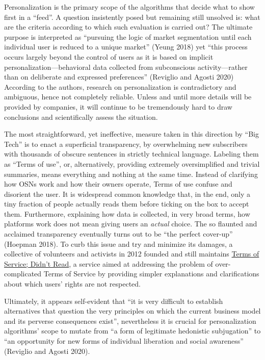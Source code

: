 \documentclass[
  a4paper,
]{book}
\begin{document}
Personalization is the primary scope of the algorithms that decide what to show first in a ``feed''. A question insistently posed but remaining still unsolved is: what are the criteria according to which such evaluation is carried out? The ultimate purpose is interpreted as ``pursuing the logic of market segmentation until each individual user is reduced to a unique market'' {(Yeung 2018)} yet ``this process occurs largely beyond the control of users as it is based on implicit personalization---behavioral data collected from subconscious activity---rather than on deliberate and expressed preferences'' {(Reviglio and Agosti 2020)} According to the authors, research on personalization is contradictory and ambiguous, hence not completely reliable. Unless and until more details will be provided by companies, it will continue to be tremendously hard to draw conclusions and scientifically assess the situation.

The most straightforward, yet ineffective, measure taken in this direction by ``Big Tech'' is to enact a superficial transparency, by overwhelming new subscribers with thousands of obscure sentences in strictly technical language. Labeling them as ``Terms of use'', or, alternatively, providing extremely oversimplified and trivial summaries, means everything and nothing at the same time. Instead of clarifying how OSNs work and how their owners operate, Terms of use confuse and disorient the user. It is widespread common knowledge that, in the end, only a tiny fraction of people actually reads them before ticking on the box to accept them. Furthermore, explaining how data is collected, in very broad terms, how platforms work does not mean giving users an \emph{actual} choice. The so flaunted and acclaimed transparency eventually turns out to be ``the perfect cover-up'' {(Hoepman 2018)}. To curb this issue and try and minimize its damages, a collective of volunteers and activists in 2012 founded and still maintains \href{https://tosdr.org/en/about}{Terms of Service; Didn't Read}, a service aimed at addressing the problem of over-complicated Terms of Service by providing simpler explanations and clarifications about which users' rights are not respected.

Ultimately, it appears self-evident that ``it is very difficult to establish alternatives that question the very principles on which the current business model and its perverse consequences exist'', nevertheless it is crucial for personalization algorithms' scope to mutate from ``a form of legitimate hedonistic subjugation'' to ``an opportunity for new forms of individual liberation and social awareness'' {(Reviglio and Agosti 2020)}.
\end{document}
